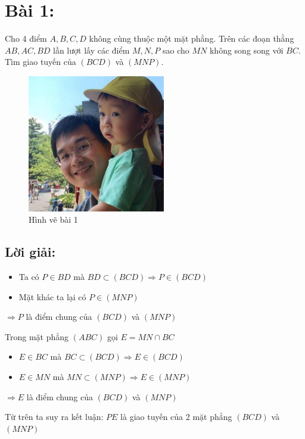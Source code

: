 \section*{Bài 1:}
Cho 4 điểm $A, B, C, D$ không cùng thuộc một mặt phẳng. Trên các đoạn thằng $AB, AC, BD$ lần lượt lấy các điểm $M, N, P$ sao cho $MN$ không song song với $BC$. Tìm giao tuyến của $(BCD)$ và $(MNP)$.
\begin{figure}[H]
\centering
\includegraphics[width=6cm]{images/cover/dhsp_logo.png}
\caption{Hình vẽ bài 1}
\end{figure}

\subsection*{Lời giải:}
\begin{itemize}
\item Ta có $P \in BD$ mà $BD \subset (BCD) \Rightarrow P \in (BCD)$ 
\item Mặt khác ta lại có $ P \in (MNP) $
\end{itemize}
$\Rightarrow P$ là điểm chung của $(BCD)$ và $(MNP)$

\vspace{5mm}
Trong mặt phẳng $(ABC)$ gọi $E = MN \cap BC$
\begin{itemize}
\item $ E \in BC$ mà $BC \subset (BCD) \Rightarrow E \in (BCD)$
\item $ E \in MN$ mà $MN \subset (MNP) \Rightarrow E \in (MNP)$
\end{itemize}
$\Rightarrow E$ là điểm chung của $(BCD)$ và $(MNP)$

\vspace{5mm}
Từ trên ta suy ra kết luận:
$PE$ là giao tuyến của 2 mặt phẳng $(BCD)$ và $(MNP)$